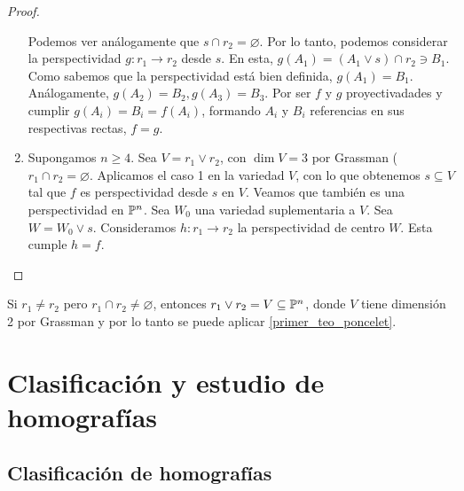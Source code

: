 \begin{proof}
\begin{enumerate}
         Podemos ver análogamente que $s \cap r_2 = \varnothing$. Por 
         lo tanto, podemos considerar la perspectividad $g: r_1 \to
         r_2$ desde $s$. En esta, $g(A_1) = (A_1 \vee s) \cap r_2 \ni
         B_1$. Como sabemos que la perspectividad está bien definida,
         $g(A_1) = B_1$. Análogamente, $g(A_2) = B_2, g(A_3) = B_3$.
         Por ser $f$ y $g$ proyectivadades y cumplir $g(A_i) = B_i =
         f(A_i)$, formando $A_i$ y $B_i$ referencias en sus 
         respectivas rectas, $f = g$.
        \item Supongamos $n \geq 4$. Sea $V = r_1 \vee r_2$, con
        $\dim V = 3$ por Grassman ($r_1 \cap r_2 = \varnothing$.
        Aplicamos el caso 1 en la variedad $V$, con lo que obtenemos
        $s \subseteq V$ tal que $f$ es perspectividad desde $s$ en
        $V$. Veamos que también es una perspectividad en $\mathbb{P}^n$.
        Sea $W_0$ una variedad suplementaria a $V$. Sea $W = W_0 \vee
        s$. Consideramos $h: r_1 \to r_2$ la perspectividad de centro
        $W$. Esta cumple $h = f$.
    \end{enumerate}
\end{proof}

\begin{obs}
    Si $r_1 \neq r_2$ pero $r_1 \cap r_2 \neq \varnothing$, entonces
    $r_1 \vee r_2 = V \subseteq \mathbb{P}^n$, donde $V$ tiene dimensión
    2 por Grassman y por lo tanto se puede 
    aplicar \ref{primer_teo_poncelet}.
\end{obs}

\section{Clasificación y estudio de homografías}

\subsection{Clasificación de homografías}

